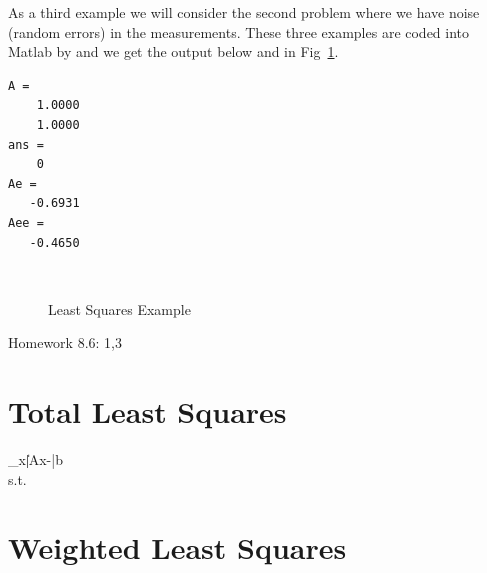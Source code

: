 As a third example we will consider the second problem where we have
noise (random errors) in the measurements.  These three examples are
coded into Matlab by
and we get the output below and in Fig~\ref{llsqex}.
\begin{list}{}{\leftmargin=3em}\item[]
\begin{verbatim}
A =
    1.0000
    1.0000
ans =
    0
Ae =
   -0.6931
Aee =
   -0.4650
\end{verbatim}
\end{list}

\begin{figure}[h]
\begin{center}
\leavevmode
\hbox{
\epsfxsize=4in
}
\end{center}
\caption{Least Squares Example}
\label{llsqex}
\end{figure}

Homework 8.6: 1,3

\section{Total Least Squares}

\beqn
\min_x\|\bar Ax-\bar b\| \\
s.t.\;
\eeqn

\section{Weighted Least Squares}\label{s-wls}

